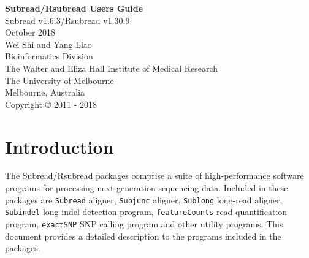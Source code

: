 \documentclass[12pt]{report}
\newcommand{\code}[1]{{\small\texttt{#1}}}
\begin{document}
\begin{titlepage}

\begin{center}
{\Huge\bf Subread/Rsubread Users Guide}\\
\vspace{1 cm}
{\centering\large Subread v1.6.3/Rsubread v1.30.9\\}
\vspace{1 cm}
 October 2018\\
\vspace{5 cm}
\Large Wei Shi and Yang Liao\\
\vspace{1 cm}
\small
{\large Bioinformatics Division\\
The Walter and Eliza Hall Institute of Medical Research\\
The University of Melbourne\\
Melbourne, Australia\\}
\vspace{7 cm}
\centering Copyright \small{\copyright}  2011 - 2018\\
\end{center}

\end{titlepage}

\tableofcontents

\chapter{Introduction}

The Subread/Rsubread packages comprise a suite of high-performance software programs for processing next-generation sequencing data.
Included in these packages are \code{Subread} aligner, \code{Subjunc} aligner, \code{Sublong} long-read aligner, \code{Subindel} long indel detection program, \code{featureCounts} read quantification program, \code{exactSNP} SNP calling program and other utility programs.
This document provides a detailed description to the programs included in the packages.
\end{document}
